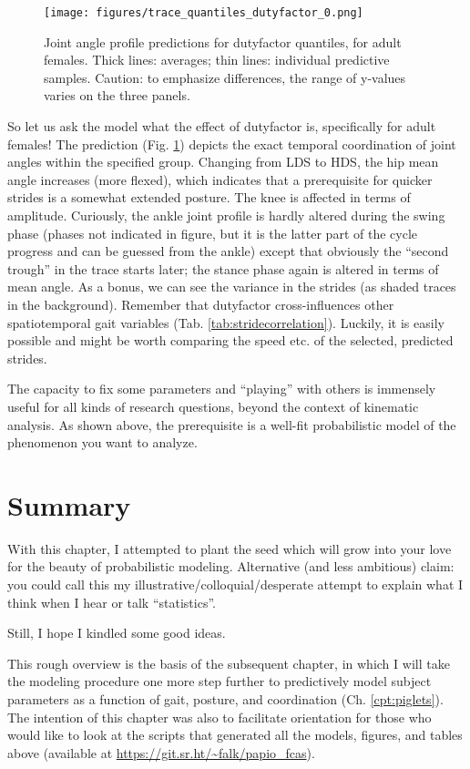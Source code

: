 \begin{figure}[p]
\centering
\texttt{[image: figures/trace\_quantiles\_dutyfactor\_0.png]}
\caption{\label{fig:dutyquantileprediction}Joint angle profile predictions for dutyfactor quantiles, for adult females. Thick lines: averages; thin lines: individual predictive samples. Caution: to emphasize differences, the range of y-values varies on the three panels.}
\end{figure}

So let us ask the model what the effect of dutyfactor is, specifically for adult females!
The prediction (Fig. \ref{fig:dutyquantileprediction}) depicts the exact temporal coordination of joint angles within the specified group.
Changing from LDS to HDS, the hip mean angle increases (more flexed), which indicates that a prerequisite for quicker strides is a somewhat extended posture.
The knee is affected in terms of amplitude.
Curiously, the ankle joint profile is hardly altered during the swing phase (phases not indicated in figure, but it is the latter part of the cycle progress and can be guessed from the ankle) except that obviously the ``second trough'' in the trace starts later; the stance phase again is altered in terms of mean angle.
As a bonus, we can see the variance in the strides (as shaded traces in the background).
Remember that dutyfactor cross-influences other spatiotemporal gait variables (Tab. \ref{tab:stridecorrelation}).
Luckily, it is easily possible and might be worth comparing the speed etc. of the selected, predicted strides.


The capacity to fix some parameters and ``playing'' with others is immensely useful for all kinds of research questions, beyond the context of kinematic analysis.
As shown above, the prerequisite is a well-fit probabilistic model of the phenomenon you want to analyze.



\FloatBarrier
\clearpage
\section{Summary}
\label{sec:org527d8db}
With this chapter, I attempted to plant the seed which will grow into your love for the beauty of probabilistic modeling.
Alternative (and less ambitious) claim: you could call this my illustrative/colloquial/desperate attempt to explain what I think when I hear or talk ``statistics''.

Still, I hope I kindled some good ideas.
\medskip

This rough overview is the basis of the subsequent chapter, in which I will take the modeling procedure one more step further to predictively model subject parameters as a function of gait, posture, and coordination (Ch. \ref{cpt:piglets}).
The intention of this chapter was also to facilitate orientation for those who would like to look at the scripts that generated all the models, figures, and tables above (available at \url{https://git.sr.ht/~falk/papio_fcas}).


\FloatBarrier
\clearpage

\nocite{Gelman2013}

% 
% 
